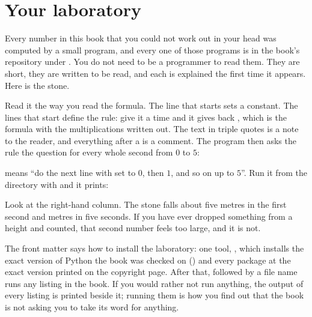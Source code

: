 \section{Your laboratory}
\label{sec:ch01-lab}

\noindent
Every number in this book that you could not work out in your head was
computed by a small program, and every one of those programs is in the
book's repository under . You do not need to be a programmer to
read them. They are short, they are written to be read, and each is
explained the first time it appears. Here is the stone.


\noindent
Read it the way you read the formula. The line that starts  sets a
constant. The lines that start  define the rule: give it a
time  and it gives back , which is the formula
with the multiplications written out. The text in triple quotes is a note to
the reader, and everything after a \code{\#} is a comment. The program then
asks the rule the question for every whole second from $0$ to $5$:


\noindent
{} means \enquote{do the next line with  set to
$0$, then $1$, and so on up to $5$}. Run it from the  directory
with  and it prints:


\noindent
Look at the right-hand column. The stone falls about five metres in the
first second and  metres in five seconds. If you have
ever dropped something from a height and counted, that second number feels
too large, and it is not.

\begin{note}
The front matter says how to install the laboratory: one tool, ,
which installs the exact version of Python the book was checked on
(\pypatch) and every package at the exact version printed on the copyright
page. After that,  followed by a file name runs any
listing in the book. If you would rather not run anything, the output of
every listing is printed beside it; running them is how you find out that
the book is not asking you to take its word for anything.
\end{note}

